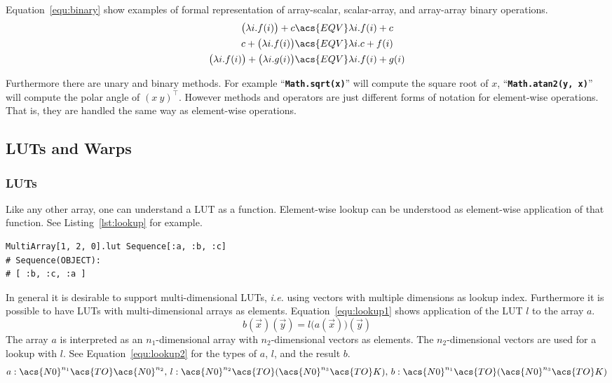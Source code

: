 \documentclass[12pt,a4paper,oneside,openright]{book}
\newcommand{\Eg}{For ex\-am\-ple }
\newcommand{\ie}{\emph{i.e.} }
\newcommand{\Ie}{That is, }
\newcommand{\equ}[1]{Equation~\ref{equ:#1}}
\newcommand{\lst}[1]{Listing~\ref{lst:#1}}
\newcommand{\code}[1]{``\texttt{\textbf{\textcolor{codegray}{\small{#1}}}}''}
\begin{document}
\begin{CJK}{UTF8}{}
\equ{binary} show examples of formal representation of array-scalar, scalar-array, and array-array binary operations.
\begin{align}\label{equ:binary}
  \begin{split}
    \big(\lambda i.f(i)\big)+c&\acs{EQV}\lambda i.f(i)+c\\
    c+\big(\lambda i.f(i)\big)&\acs{EQV}\lambda i.c+f(i)\\
    \big(\lambda i.f(i)\big)+\big(\lambda i.g(i)\big)&\acs{EQV}\lambda i.f(i)+g(i)
  \end{split}
\end{align}

Furthermore there are unary and binary methods. \Eg \code{Math.sqrt(x)} will compute the square root of $x$, \code{Math.atan2(y, x)} will compute the polar angle of $(x\ y)^\top$. However methods and operators are just different forms of notation for element-wise operations. \Ie they are handled the same way as element-wise operations.

\subsection{\acsp{LUT} and Warps}\label{cha:lutwarps}
\subsubsection{\acsp{LUT}}
Like any other array, one can understand a \ac{LUT} as a function. Element-wise lookup can be understood as element-wise application of that function. See \lst{lookup} for example.
\lstset{language=Ruby,frame=single,numbers=none}
\begin{lstlisting}[float=htbp,caption={Element-wise application of a \acs{LUT}},escapechar=\$,label=lst:lookup]
MultiArray[1, 2, 0].lut Sequence[:a, :b, :c]
# Sequence(OBJECT):
# [ :b, :c, :a ]
\end{lstlisting}

In general it is desirable to support multi-dimensional \acp{LUT}, \ie using vectors with multiple dimensions as lookup index. Furthermore it is possible to have \acp{LUT} with multi-dimensional arrays as elements. \equ{lookup1} shows application of the \ac{LUT} $l$ to the array $a$.
\begin{equation}\label{equ:lookup1}
  b(\vec{x})(\vec{y})=l\big(a(\vec{x})\big)(\vec{y})
\end{equation}
The array $a$ is interpreted as an $n_1$-dimensional array with $n_2$-dimensional vectors as elements. The $n_2$-dimensional vectors are used for a lookup with $l$. See \equ{lookup2} for the types of $a$, $l$, and the result $b$.
\begin{equation}\label{equ:lookup2}
a:\acs{N0}^{n_1}\acs{TO}\acs{N0}^{n_2}\mathrm{,\ }
l:\acs{N0}^{n_2}\acs{TO} (\acs{N0}^{n_3}\acs{TO} K)\mathrm{,\ }
b:\acs{N0}^{n_1}\acs{TO} (\acs{N0}^{n_3}\acs{TO} K)
\end{equation}


\end{CJK}
\end{document}
